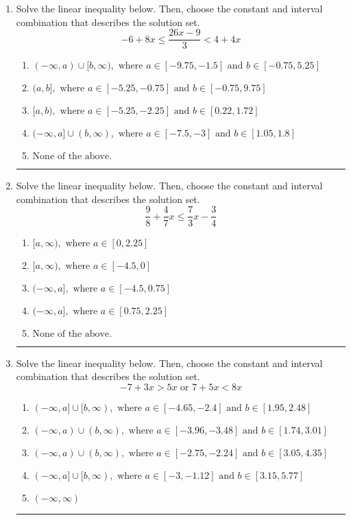 \documentclass[14pt]{extbook}
\newcommand{\litem}[1]{\item#1\hspace*{-1cm}\rule{\textwidth}{0.4pt}}
\begin{document}
\begin{enumerate}
{\begin{enumerate}[label=\Alph*.]
\end{enumerate} }
\litem{
Solve the linear inequality below. Then, choose the constant and interval combination that describes the solution set.\[ -6 + 8 x \leq \frac{26 x - 9}{3} < 4 + 4 x \]\begin{enumerate}[label=\Alph*.]
\item \( (-\infty, a) \cup [b, \infty), \text{ where } a \in [-9.75, -1.5] \text{ and } b \in [-0.75, 5.25] \)
\item \( (a, b], \text{ where } a \in [-5.25, -0.75] \text{ and } b \in [-0.75, 9.75] \)
\item \( [a, b), \text{ where } a \in [-5.25, -2.25] \text{ and } b \in [0.22, 1.72] \)
\item \( (-\infty, a] \cup (b, \infty), \text{ where } a \in [-7.5, -3] \text{ and } b \in [1.05, 1.8] \)
\item \( \text{None of the above.} \)

\end{enumerate} }
\litem{
Solve the linear inequality below. Then, choose the constant and interval combination that describes the solution set.\[ \frac{9}{8} + \frac{4}{7} x \leq \frac{7}{3} x - \frac{3}{4} \]\begin{enumerate}[label=\Alph*.]
\item \( [a, \infty), \text{ where } a \in [0, 2.25] \)
\item \( [a, \infty), \text{ where } a \in [-4.5, 0] \)
\item \( (-\infty, a], \text{ where } a \in [-4.5, 0.75] \)
\item \( (-\infty, a], \text{ where } a \in [0.75, 2.25] \)
\item \( \text{None of the above}. \)

\end{enumerate} }
\litem{
Solve the linear inequality below. Then, choose the constant and interval combination that describes the solution set.\[ -7 + 3 x > 5 x \text{ or } 7 + 5 x < 8 x \]\begin{enumerate}[label=\Alph*.]
\item \( (-\infty, a] \cup [b, \infty), \text{ where } a \in [-4.65, -2.4] \text{ and } b \in [1.95, 2.48] \)
\item \( (-\infty, a) \cup (b, \infty), \text{ where } a \in [-3.96, -3.48] \text{ and } b \in [1.74, 3.01] \)
\item \( (-\infty, a) \cup (b, \infty), \text{ where } a \in [-2.75, -2.24] \text{ and } b \in [3.05, 4.35] \)
\item \( (-\infty, a] \cup [b, \infty), \text{ where } a \in [-3, -1.12] \text{ and } b \in [3.15, 5.77] \)
\item \( (-\infty, \infty) \)


\end{enumerate}}
\end{enumerate}
\end{document}
